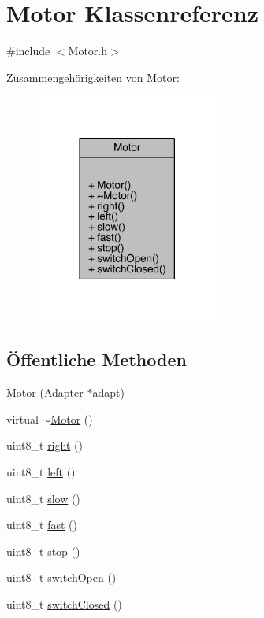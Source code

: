 \hypertarget{class_motor}{}\section{Motor Klassenreferenz}
\label{class_motor}


{\ttfamily \#include $<$Motor.\+h$>$}



Zusammengehörigkeiten von Motor\+:\nopagebreak
\begin{figure}[H]
\begin{center}
\leavevmode
\includegraphics[width=170pt]{class_motor__coll__graph}
\end{center}
\end{figure}
\subsection*{Öffentliche Methoden}
\begin{DoxyCompactItemize}
\item 
\hyperlink{class_motor_a9150fc4647f7588364cb75dca1df4c96}{Motor} (\hyperlink{class_adapter}{Adapter} $\ast$adapt)
\item 
virtual \hyperlink{class_motor_a2e57c7b2681efea1d3b7f253ee88ecd4}{$\sim$\+Motor} ()
\item 
uint8\+\_\+t \hyperlink{class_motor_a517e585f6a9a335347f9a1230d2fc0e1}{right} ()
\item 
uint8\+\_\+t \hyperlink{class_motor_ae8af72c3a398bb959090d0be1083f5d7}{left} ()
\item 
uint8\+\_\+t \hyperlink{class_motor_a960a19729dc479265b1e5fea243de4c0}{slow} ()
\item 
uint8\+\_\+t \hyperlink{class_motor_a09b1a5376d1ea0eb39dff2ebcc325bde}{fast} ()
\item 
uint8\+\_\+t \hyperlink{class_motor_aab732159d4adf537bbcd3bcf9371d03b}{stop} ()
\item 
uint8\+\_\+t \hyperlink{class_motor_a35c0d7c6350b9f670dc243d31ea40263}{switch\+Open} ()
\item 
uint8\+\_\+t \hyperlink{class_motor_a38af68cbad8be09b85afc86f156f0f89}{switch\+Closed} ()
\end{DoxyCompactItemize}


